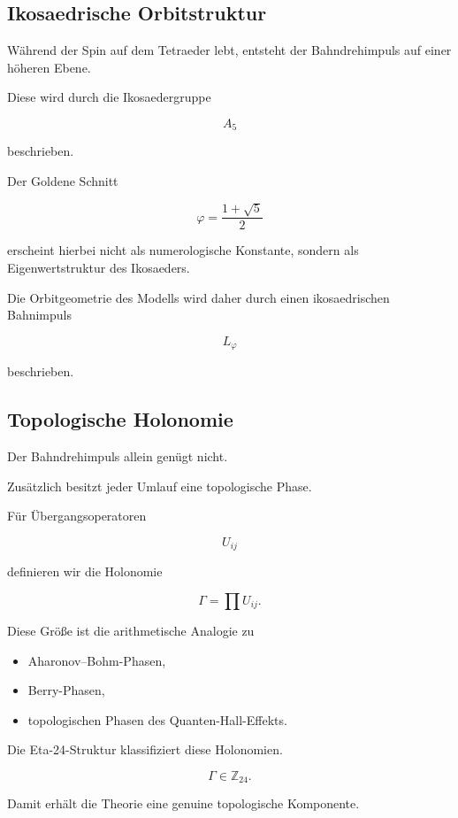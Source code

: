 \documentclass[11pt,a4paper]{article}
\theoremstyle{definition}
\theoremstyle{remark}
\begin{document}
	\subsection{Ikosaedrische Orbitstruktur}
	
	Während der Spin auf dem Tetraeder lebt,
	entsteht der Bahndrehimpuls auf einer höheren Ebene.
	
	Diese wird durch die Ikosaedergruppe
	
	\[
	A_5
	\]
	
	beschrieben.
	
	Der Goldene Schnitt
	
	\[
	\varphi
	=
	\frac{1+\sqrt5}{2}
	\]
	
	erscheint hierbei nicht als numerologische Konstante,
	sondern als Eigenwertstruktur des Ikosaeders.
	
	Die Orbitgeometrie des Modells wird daher
	durch einen ikosaedrischen Bahnimpuls
	
	\[
	L_\varphi
	\]
	
	beschrieben.
	
	
	\subsection{Topologische Holonomie}
	
	Der Bahndrehimpuls allein genügt nicht.
	
	Zusätzlich besitzt jeder Umlauf
	eine topologische Phase.
	
	Für Übergangsoperatoren
	
	\[
	U_{ij}
	\]
	
	definieren wir die Holonomie
	
	\[
	\Gamma
	=
	\prod U_{ij}.
	\]
	
	Diese Größe ist die arithmetische Analogie zu
	
	\begin{itemize}
	\item Aharonov--Bohm-Phasen,
	\item Berry-Phasen,
	\item topologischen Phasen des Quanten-Hall-Effekts.
	\end{itemize}
	
	Die Eta-24-Struktur klassifiziert diese Holonomien.
	
	\[
	\Gamma
	\in
	\mathbb Z_{24}.
	\]
	
	Damit erhält die Theorie eine genuine
	topologische Komponente.
	
\end{document}
